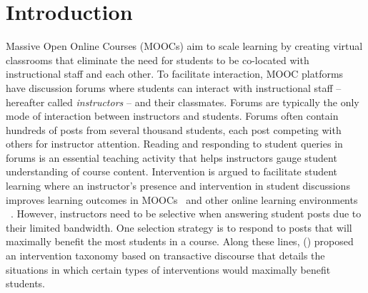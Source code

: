 \documentclass[letterpaper]{article}
\begin{document}
\section{Introduction}
\label{sect:intro}
Massive Open Online Courses (MOOCs) aim to scale learning by creating 
virtual classrooms that eliminate the need for students to be co-located 
with instructional staff and each other. To facilitate interaction, MOOC 
platforms have discussion forums where students can interact with instructional 
staff -- hereafter called {\it instructors} -- and their classmates. Forums are 
typically the only mode of interaction between instructors and 
students. Forums often contain hundreds of posts from several thousand 
students, each post competing with others for instructor attention.  
Reading and responding to student queries in forums is an essential teaching 
activity that helps instructors gauge student understanding of course 
content. Intervention is argued to facilitate student learning where an 
instructor's presence 
and intervention in student discussions improves learning 
outcomes in MOOCs~\cite{chen2016} and other online learning environments ~\cite{garrison_critical_1999,phirangee_exploring_2016}. 
However, instructors need to be selective when answering student posts due to 
their limited bandwidth. One selection strategy is to respond 
to posts that will maximally benefit the most students in a course. 
Along these lines, \citeauthor{chandrasekaran2015towards} (\citeyear{chandrasekaran2015towards}) 
proposed an intervention taxonomy based on transactive discourse that details 
the situations in which certain types of interventions would maximally benefit 
students. 
\end{document}
